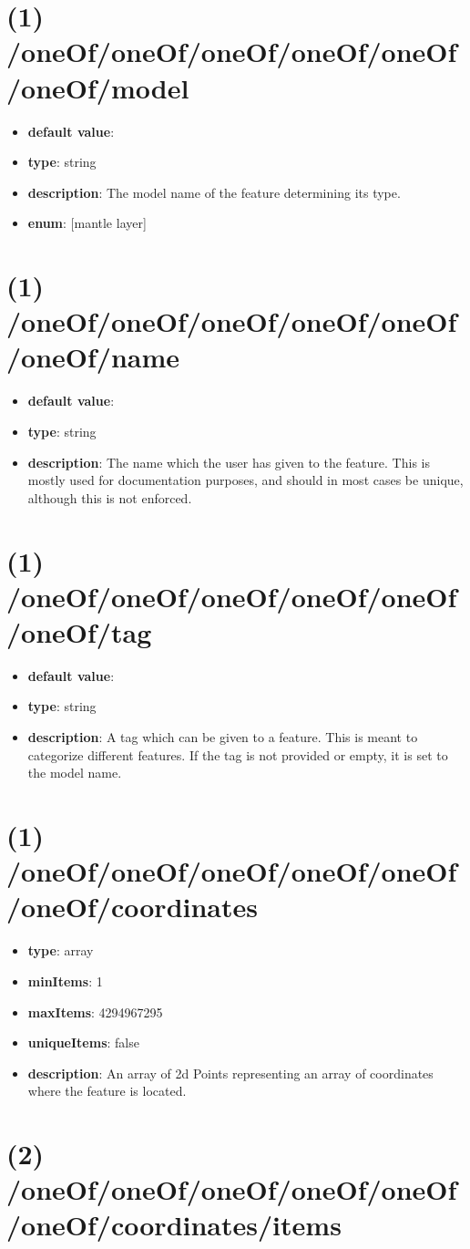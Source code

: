 \section{(1) /oneOf/oneOf/oneOf/oneOf/oneOf/oneOf/model}
\begin{itemize}[leftmargin=1em]\item {\bf default value}: 
\item {\bf type}: string
\item {\bf description}: The model name of the feature determining its type.
\item {\bf enum}: [mantle layer]\end{itemize}\section{(1) /oneOf/oneOf/oneOf/oneOf/oneOf/oneOf/name}
\begin{itemize}[leftmargin=1em]\item {\bf default value}: 
\item {\bf type}: string
\item {\bf description}: The name which the user has given to the feature. This is mostly used for documentation purposes, and should in most cases be unique, although this is not enforced.
\end{itemize}\section{(1) /oneOf/oneOf/oneOf/oneOf/oneOf/oneOf/tag}
\begin{itemize}[leftmargin=1em]\item {\bf default value}: 
\item {\bf type}: string
\item {\bf description}: A tag which can be given to a feature. This is meant to categorize different features. If the tag is not provided or empty, it is set to the model name.
\end{itemize}\section{(1) /oneOf/oneOf/oneOf/oneOf/oneOf/oneOf/coordinates}
\begin{itemize}[leftmargin=1em]\item {\bf type}: array
\item {\bf minItems}: 1
\item {\bf maxItems}: 4294967295
\item {\bf uniqueItems}: false
\item {\bf description}: An array of 2d Points representing an array of coordinates where the feature is located.
\end{itemize}\section{(2) /oneOf/oneOf/oneOf/oneOf/oneOf/oneOf/coordinates/items}
